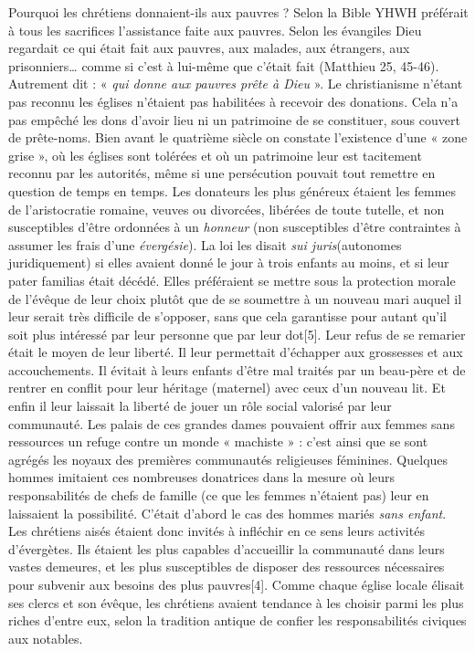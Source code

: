  Pourquoi les chrétiens donnaient-ils aux pauvres ? Selon la Bible YHWH préférait à tous les sacrifices l'assistance faite aux pauvres. Selon les évangiles Dieu regardait ce qui était fait aux pauvres, aux malades, aux étrangers, aux prisonniers… comme si c'est à lui-même que c'était fait (Matthieu 25, 45-46). Autrement dit : « \emph{qui donne aux pauvres prête à Dieu} ». 
 Le christianisme n'étant pas reconnu les églises n'étaient pas habilitées à recevoir des donations. Cela n'a pas empêché les dons d'avoir lieu ni un patrimoine de se constituer, sous couvert de prête-noms. Bien avant le quatrième siècle on constate l'existence d'une « zone grise », où les églises sont tolérées et où un patrimoine leur est tacitement reconnu par les autorités, même si une persécution pouvait tout remettre en question de temps en temps. 
 Les donateurs les plus généreux étaient les femmes de l'aristocratie romaine, veuves ou divorcées, libérées de toute tutelle, et non susceptibles d'être ordonnées à un \emph{honneur} (non susceptibles d'être contraintes à assumer les frais d'une \emph{évergésie}). La loi les disait \emph{sui juris}(autonomes juridiquement) si elles avaient donné le jour à trois enfants au moins, et si leur pater familias était décédé. Elles préféraient se mettre sous la protection morale de l'évêque de leur choix plutôt que de se soumettre à un nouveau mari auquel il leur serait très difficile de s'opposer, sans que cela garantisse pour autant qu'il soit plus intéressé par leur personne que par leur dot[5]. Leur refus de se remarier était le moyen de leur liberté. Il leur permettait d'échapper aux grossesses et aux accouchements. Il évitait à leurs enfants d'être mal traités par un beau-père et de rentrer en conflit pour leur héritage (maternel) avec ceux d'un nouveau lit. Et enfin il leur laissait la liberté de jouer un rôle social valorisé par leur communauté. Les palais de ces grandes dames pouvaient offrir aux femmes sans ressources un refuge contre un monde « machiste » : c'est ainsi que se sont agrégés les noyaux des premières communautés religieuses féminines. 
 Quelques hommes imitaient ces nombreuses donatrices dans la mesure où leurs responsabilités de chefs de famille (ce que les femmes n'étaient pas) leur en laissaient la possibilité. C'était d'abord le cas des hommes mariés \emph{sans enfant}.
 Les chrétiens aisés étaient donc invités à infléchir en ce sens leurs activités d'évergètes. Ils étaient les plus capables d'accueillir la communauté dans leurs vastes demeures, et les plus susceptibles de disposer des ressources nécessaires pour subvenir aux besoins des plus pauvres[4]. Comme chaque église locale élisait ses clercs et son évêque, les chrétiens avaient tendance à les choisir parmi les plus riches d'entre eux, selon la tradition antique de confier les responsabilités civiques aux notables. 

